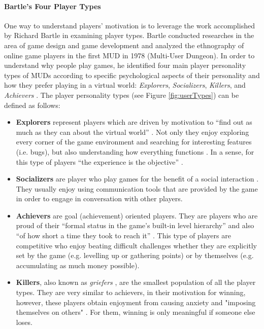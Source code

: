 \paragraph{Bartle's Four Player Types}

One way to understand players' motivation is to leverage the work accomplished by Richard Bartle in examining player types. Bartle conducted researches in the area of game design and game development and analyzed the ethnography of online game players in the first MUD in 1978 (Multi-User Dungeon). In order to understand why people play games, he identified four main player personality types of MUDs according to specific psychological aspects of their personality and how they prefer playing in a virtual world: \textit{Explorers}, \textit{Socializers}, \textit{Killers}, and \textit{Achievers} \cite{bartle1996hearts}. The player personality types (see Figure \ref{fig:userTypes}) can be defined as follows:
\begin{itemize}
\item \textbf{Explorers} represent players which are driven by motivation to ``find out as much as they can about the 
virtual  world'' \cite{bartle1996hearts}. Not only they enjoy exploring every corner of the game environment and searching for interesting features (i.e. bugs), but also understanding  how 
everything functions \cite{bartle1996hearts}. 
In a sense, for this type of players ``the experience
is the objective'' \cite{zichermann2011gamification}.
\item \textbf{Socializers} are player who play games for the benefit of a social interaction \cite{zichermann2011gamification}. They usually enjoy using communication tools that are provided by the game in order to engage in conversation with other players. 
\item \textbf{Achievers} are goal (achievement) oriented players. They are players who are proud of their ``formal status in the game's built-in level hierarchy'' and also ``of how short a time they took to reach it'' \cite{bartle1996hearts}. This type of players are competitive who enjoy beating difficult challenges whether they are explicitly  set by the game (e.g.  levelling  up  or  gathering  points) or by themselves (e.g. accumulating as much money possible). 
\item \textbf{Killers}, also known as \textit{griefers} \cite{zichermann2011gamification}, are the smallest population of all the player types. They are very similar to achievers, in their motivation for winning, however, these players obtain  enjoyment from causing anxiety and "imposing  themselves  on  others" \cite{bartle1996hearts}. For them, winning is only meaningful if someone else loses.
\end{itemize}
